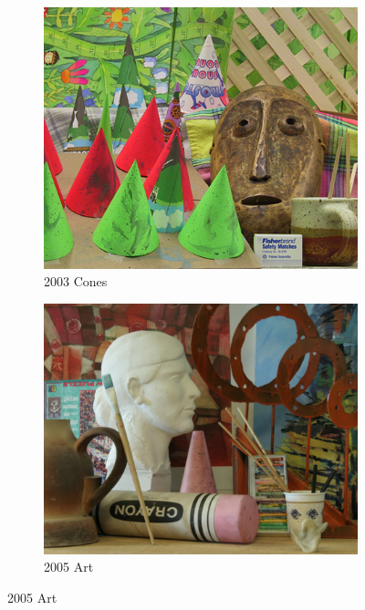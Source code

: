 \begin{figure}
    \centering
    \begin{subfigure}[t]{0.33\linewidth}
        \centering
        \includegraphics[width=\linewidth]{Images/Chap_5/2003cones.png}
        \caption{2003 Cones}
        \label{fig:2003_cones}
    \end{subfigure}\hfill
    \begin{subfigure}[t]{0.33\linewidth}
        \centering
        \includegraphics[width=\linewidth]{Images/Chap_5/2005art.png}
        \caption{2005 Art}
        \label{fig:2005_art}

\end{subfigure}
\end{figure}
